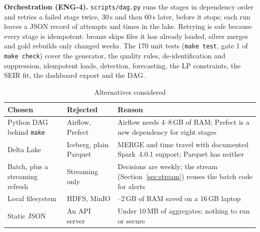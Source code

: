 \textbf{Orchestration (ENG-4).} \texttt{scripts/dag.py} runs the stages in dependency order and retries a
failed stage twice, 30\,s and then 60\,s later, before it stops; each run leaves a JSON record of attempts and
times in the lake. Retrying is safe because every stage is idempotent: bronze skips files it has already
loaded, silver merges and gold rebuilds only changed weeks. The 170 unit tests (\texttt{make test}, gate 1 of \texttt{make check}) cover the generator, the quality
rules, de-identification and suppression, idempotent loads, detection, forecasting, the LP constraints, the
SEIR fit, the dashboard export and the DAG.

\begin{table}[htbp]
\caption{Alternatives considered}
\label{tab:alternatives}
\centering\footnotesize
\begin{tabular}{@{}>{\raggedright\arraybackslash}p{1.5cm}>{\raggedright\arraybackslash}p{1.5cm}>{\raggedright\arraybackslash}p{4.4cm}@{}}
\toprule
Chosen & Rejected & Reason \\
\midrule
Python DAG behind \texttt{make} & Airflow, Prefect & Airflow needs 4--8\,GB of RAM; Prefect is a new dependency for eight stages \\
Delta Lake & Iceberg, plain Parquet & MERGE and time travel with documented Spark~4.0.1 support; Parquet has neither \\
Batch, plus a streaming refresh & Streaming only & Decisions are weekly; the stream (Section~\ref{sec:stream}) reuses the batch code for alerts \\
Local filesystem & HDFS, MinIO & 1--2\,GB of RAM saved on a 16\,GB laptop \\
Static JSON & An API server & Under 10\,MB of aggregates; nothing to run or secure \\
\bottomrule
\end{tabular}
\end{table}
